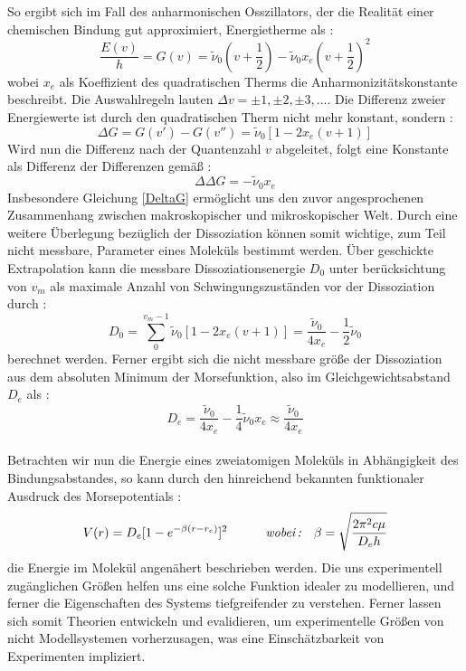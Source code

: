 So ergibt sich im Fall des anharmonischen Osszillators, der die Realität einer chemischen Bindung gut approximiert, Energietherme als :
\begin{equation}
\frac{E(v)}{h} = G(v) = \tilde{\nu}_0(v+\frac{1}{2})-\tilde{\nu}_0x_e(v+\frac{1}{2})^2
\end{equation}
wobei $x_e$ als Koeffizient des quadratischen Therms die Anharmonizitätskonstante beschreibt. Die Auswahlregeln lauten $\Delta v = \pm 1, \pm 2, \pm 3, ... $. Die Differenz zweier Energiewerte ist durch den quadratischen Therm nicht mehr konstant, sondern : 
\begin{equation}
\Delta G = G(v')-G(v'') = \tilde{\nu}_0[1-2x_e(v+1)]
\end{equation}
Wird nun die Differenz nach der Quantenzahl $v$ abgeleitet, folgt eine Konstante als Differenz der Differenzen gemäß : 
\begin{equation}
\Delta\Delta G = -\tilde{\nu}_0x_e
\label{DeltaG}
\end{equation}
Insbesondere Gleichung \ref{DeltaG} ermöglicht uns den zuvor angesprochenen Zusammenhang zwischen makroskopischer und mikroskopischer Welt. Durch eine weitere Überlegung bezüglich der Dissoziation können somit wichtige, zum Teil nicht messbare, Parameter eines Moleküls bestimmt werden. Über geschickte Extrapolation kann die messbare Dissoziationsenergie $D_0$ unter berücksichtung von $v_m$ als maximale Anzahl von Schwingungszuständen vor der Dissoziation durch : 
\begin{equation}
D_0 = \sum_{0}^{v_m-1}\tilde{\nu}_0[1-2x_e(v+1)]=\frac{\tilde{\nu}_0}{4x_e}-\frac{1}{2}\tilde{\nu}_0
\end{equation}
berechnet werden. Ferner ergibt sich die nicht messbare größe der Dissoziation aus dem absoluten Minimum der Morsefunktion, also im Gleichgewichtsabstand $D_e$ als : \\
\begin{equation}
D_e = \frac{\tilde{\nu}_0}{4x_e}-\frac{1}{4}\tilde{\nu}_0x_e\approx\frac{\tilde{\nu}_0}{4x_e}
\end{equation}
\\
Betrachten wir nun die Energie eines zweiatomigen Moleküls in Abhängigkeit des Bindungsabstandes, so kann durch den hinreichend bekannten funktionaler Ausdruck des Morsepotentials : \\
\begin{equation}
V(r) = D_e[1-e^{-\beta(r-r_e)}]^2 \quad\quad\quad \textit{wobei\,:}\quad \beta = \sqrt{\frac{2\pi^2c\mu}{D_eh}}
\end{equation}
die Energie im Molekül angenähert beschrieben werden. Die uns experimentell zugänglichen Größen helfen uns eine solche Funktion idealer zu modellieren, und ferner die Eigenschaften des Systems tiefgreifender zu verstehen. Ferner lassen sich somit Theorien entwickeln und evalidieren, um experimentelle Größen von nicht Modellsystemen vorherzusagen, was eine Einschätzbarkeit von Experimenten impliziert.
%